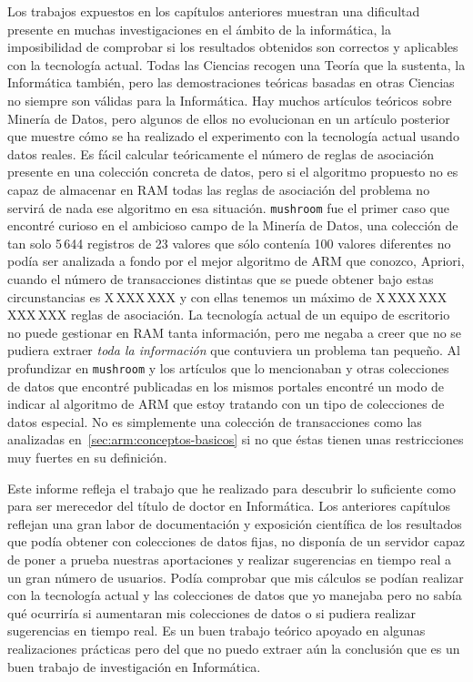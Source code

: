 Los trabajos expuestos en los capítulos anteriores muestran una dificultad presente en muchas investigaciones en el ámbito de la informática, la imposibilidad de comprobar si los resultados obtenidos son correctos y aplicables con la tecnología actual. Todas las Ciencias recogen una Teoría que la sustenta, la Informática también, pero las demostraciones teóricas basadas en otras Ciencias no siempre son válidas para la Informática. Hay muchos artículos teóricos sobre Minería de Datos, pero algunos de ellos no evolucionan en un artículo posterior que muestre cómo se ha realizado el experimento con la tecnología actual usando datos reales. Es fácil calcular teóricamente el número de reglas de asociación presente en una colección concreta de datos, pero si el algoritmo propuesto no es capaz de almacenar en RAM todas las reglas de asociación del problema no servirá de nada ese algoritmo en esa situación. \texttt{mushroom} fue el primer caso que encontré curioso en el ambicioso campo de la Minería de Datos, una colección de tan solo 5\,644 registros de 23 valores que sólo contenía 100 valores diferentes no podía ser analizada a fondo por el mejor algoritmo de ARM que conozco, Apriori, cuando el número de transacciones distintas que se puede obtener bajo estas circunstancias es X\,XXX\,XXX y con ellas tenemos un máximo de X\,XXX\,XXX\,XXX\,XXX reglas de asociación. La tecnología actual de un equipo de escritorio no puede gestionar en RAM tanta información, pero me negaba a creer que no se pudiera extraer \emph{toda la información} que contuviera un problema tan pequeño. Al profundizar en \texttt{mushroom} y los artículos que lo mencionaban y otras colecciones de datos que encontré publicadas en los mismos portales encontré un modo de indicar al algoritmo de ARM que estoy tratando con un tipo de colecciones de datos especial. No es simplemente una colección de transacciones como las analizadas en~\ref{sec:arm:conceptos-basicos} si no que éstas tienen unas restricciones muy fuertes en su definición.

Este informe refleja el trabajo que he realizado para descubrir lo suficiente como para ser merecedor del título de doctor en Informática. Los anteriores capítulos reflejan una gran labor de documentación y exposición científica de los resultados que podía obtener con colecciones de datos fijas, no disponía de un servidor capaz de poner a prueba nuestras aportaciones y realizar sugerencias en tiempo real a un gran número de usuarios. Podía comprobar que mis cálculos se podían realizar con la tecnología actual y las colecciones de datos que yo manejaba pero no sabía qué ocurriría si aumentaran mis colecciones de datos o si pudiera realizar sugerencias en tiempo real. Es un buen trabajo teórico apoyado en algunas realizaciones prácticas pero del que no puedo extraer aún la conclusión que es un buen trabajo de investigación en Informática.






